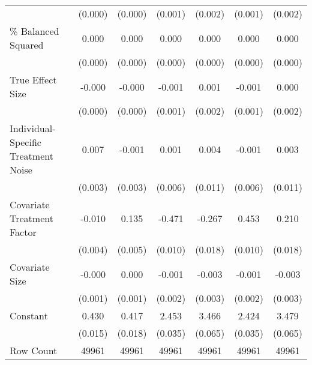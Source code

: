 \begin{landscape}
\begin{table}[htbp]
{\begin{tabular}{l*{6}{c}}
                    &     (0.000)         &     (0.000)         &     (0.001)         &     (0.002)         &     (0.001)         &     (0.002)         \\
\% Balanced Squared &       0.000\sym{***}&       0.000\sym{***}&       0.000\sym{***}&       0.000\sym{***}&       0.000\sym{***}&       0.000\sym{***}\\
                    &     (0.000)         &     (0.000)         &     (0.000)         &     (0.000)         &     (0.000)         &     (0.000)         \\
True Effect Size    &      -0.000         &      -0.000         &      -0.001         &       0.001         &      -0.001         &       0.000         \\
                    &     (0.000)         &     (0.000)         &     (0.001)         &     (0.002)         &     (0.001)         &     (0.002)         \\
Individual-Specific Treatment Noise&       0.007\sym{**} &      -0.001         &       0.001         &       0.004         &      -0.001         &       0.003         \\
                    &     (0.003)         &     (0.003)         &     (0.006)         &     (0.011)         &     (0.006)         &     (0.011)         \\
Covariate Treatment Factor&      -0.010\sym{*}  &       0.135\sym{***}&      -0.471\sym{***}&      -0.267\sym{***}&       0.453\sym{***}&       0.210\sym{***}\\
                    &     (0.004)         &     (0.005)         &     (0.010)         &     (0.018)         &     (0.010)         &     (0.018)         \\
Covariate Size      &      -0.000         &       0.000         &      -0.001         &      -0.003         &      -0.001         &      -0.003         \\
                    &     (0.001)         &     (0.001)         &     (0.002)         &     (0.003)         &     (0.002)         &     (0.003)         \\
Constant            &       0.430\sym{***}&       0.417\sym{***}&       2.453\sym{***}&       3.466\sym{***}&       2.424\sym{***}&       3.479\sym{***}\\
                    &     (0.015)         &     (0.018)         &     (0.035)         &     (0.065)         &     (0.035)         &     (0.065)         \\
\hline
Row Count           &   49961         &   49961         &   49961         &   49961         &   49961         &   49961         \\

\end{tabular}}
\end{table}
\end{landscape}
